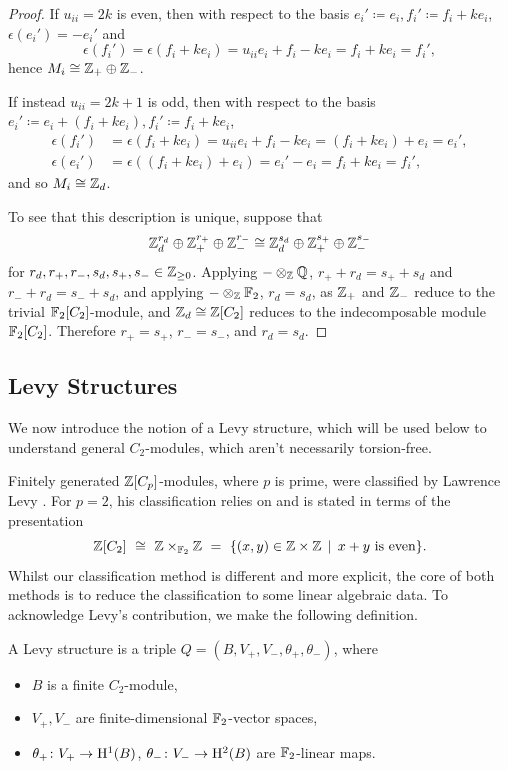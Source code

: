 \begin{proof}
If $u_{ii} = 2k$ is even, then with respect to the basis $e_i' \coloneqq e_i, f_i' \coloneqq f_i + k e_i$, $\epsilon(e_i') = - e_i'$ and
\[
\epsilon(f_i') = \epsilon(f_i + k e_i) = u_{ii} e_i + f_i - k e_i = f_i + k e_i = f_i',
\]
hence $M_i \cong {\mathbb Z}_+ \oplus {\mathbb Z}_-$.

If instead $u_{ii} = 2k + 1$ is odd, then with respect to the basis $e_i' \coloneqq e_i + (f_i + k e_i), f_i' \coloneqq f_i + k e_i$,
\begin{align*}
\epsilon(f_i') &= \epsilon(f_i + k e_i) = u_{ii} e_i + f_i - k e_i = (f_i + k e_i) + e_i = e_i', \\
\epsilon(e_i') &= \epsilon((f_i + k e_i) + e_i) = e_i' - e_i = f_i + k e_i = f_i',
\end{align*}
and so $M_i \cong {\mathbb Z}_d$.

To see that this description is unique, suppose that 
\[
{\mathbb Z}_d^{r_d} \oplus {\mathbb Z}_{+}^{r_+} \oplus {\mathbb Z}_{-}^{r_-} \cong {\mathbb Z}_d^{s_d} \oplus {\mathbb Z}_{+}^{s_+} \oplus {\mathbb Z}_{-}^{s_-}
\]
for $r_d, r_+, r_-, s_d, s_+, s_- \in {\mathbb Z}_{\geq 0}$. Applying $-\otimes_{{\mathbb Z}} {\mathbb Q}$, $r_+ + r_d = s_+ + s_d$ and $r_- + r_d = s_- + s_d$, and applying $-\otimes_{{\mathbb Z}} {\mathbb F}_2$, $r_d = s_d$, as ${\mathbb Z}_+$ and ${\mathbb Z}_-$ reduce to the trivial ${\mathbb F}_2[C_2]$-module, and ${\mathbb Z}_d \cong {\mathbb Z}[C_2]$ reduces to the indecomposable module ${\mathbb F}_2[C_2]$. Therefore $r_+ = s_+$, $r_- = s_-$, and $r_d = s_d$.
\end{proof}

\subsection{Levy Structures}

We now introduce the notion of a Levy structure, which will be used below to understand general $C_2$-modules, which aren't necessarily torsion-free.

Finitely generated ${\mathbb Z} [C_p]$-modules, where $p$ is prime, were classified by Lawrence Levy \cite{Levy81,Levy85,Levy85a}.
For $p=2$, his classification relies on and is stated in terms of the presentation 
\[ \bZ [C_2] \ \cong \ 
\bZ \times_{\bF_2} \bZ \  = \
\{ (x,y) \in \bZ \times \bZ \,\mid\, x+y \mbox{ is even}\}.
\]
Whilst our classification method is different and more explicit, the core of both methods is to reduce the classification
to some linear algebraic data. To acknowledge Levy's contribution, we make the following definition.

\begin{defn}
A Levy structure is a triple $Q=(B, V_+, V_-, {\theta_+},{\theta_-})$, where
\begin{itemize}
  \item $B$ is a finite $C_2$-module,
  \item $V_+, V_-$ are finite-dimensional ${\mathbb F}_2$-vector spaces,
  \item $\theta_+ \colon V_+ \rightarrow \mathrm{H}^1(B)$, $\theta_- \colon V_- \rightarrow \mathrm{H}^2(B)$ are ${\mathbb F}_2$-linear maps.
\end{itemize}
\end{defn}

